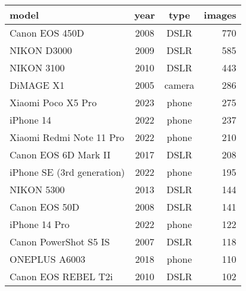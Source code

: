 \begin{tabular}{lccr}
\toprule
\textbf{model} & \textbf{year} & \textbf{type} & \textbf{images} \\ 
\midrule
Canon EOS 450D             & 2008 & DSLR   & 770 \\
NIKON D3000                & 2009 & DSLR   & 585 \\
NIKON 3100                 & 2010 & DSLR   & 443 \\
DiMAGE X1                  & 2005 & camera & 286 \\
Xiaomi Poco X5 Pro         & 2023 & phone  & 275 \\
iPhone 14                  & 2022 & phone  & 237 \\
Xiaomi Redmi Note 11 Pro   & 2022 & phone  & 210 \\
Canon EOS 6D Mark II       & 2017 & DSLR   & 208 \\
iPhone SE (3rd generation) & 2022 & phone  & 195 \\
NIKON 5300                 & 2013 & DSLR   & 144 \\
Canon EOS 50D              & 2008 & DSLR   & 141 \\
iPhone 14 Pro              & 2022 & phone  & 122 \\
Canon PowerShot S5 IS      & 2007 & DSLR   & 118 \\
ONEPLUS A6003              & 2018 & phone  & 110 \\
Canon EOS REBEL T2i        & 2010 & DSLR   & 102 \\
\bottomrule
\end{tabular}